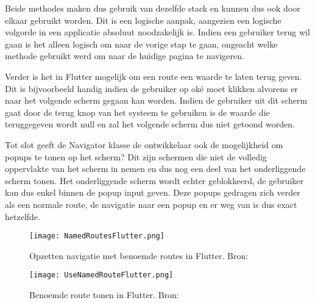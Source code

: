 Beide methodes maken dus gebruik van dezelfde stack en kunnen dus ook door elkaar gebruikt worden. Dit is een logische aanpak, aangezien een logische volgorde in een applicatie absoluut noodzakelijk is. Indien een gebruiker terug wil gaan is het alleen logisch om naar de vorige stap te gaan, ongeacht welke methode gebruikt werd om naar de huidige pagina te navigeren. 

Verder is het in Flutter mogelijk om een route een waarde te laten terug geven. Dit is bijvoorbeeld handig indien de gebruiker op oké moet klikken alvorens er naar het volgende scherm gegaan kan worden. Indien de gebruiker uit dit scherm gaat door de terug knop van het systeem te gebruiken is de waarde die teruggegeven wordt null en zal het volgende scherm dus niet getoond worden.

Tot slot geeft de Navigator klasse de ontwikkelaar ook de mogelijkheid om popups te tonen op het scherm? Dit zijn schermen die niet de volledig oppervlakte van het scherm in nemen en dus nog een deel van het onderliggende scherm tonen. Het onderliggende scherm wordt echter geblokkeerd, de gebruiker kan dus enkel binnen de popup input geven. Deze popups gedragen zich verder als een normale route, de navigatie naar een popup en er weg van is dus exact hetzelfde.

\begin{figure}
    \texttt{[image: NamedRoutesFlutter.png]}
    \caption{Opzetten navigatie met benoemde routes in Flutter. Bron: \textcite{Flutter.dev2020}}
    \label{fig:namedRoutesFlutter}
\end{figure}

\begin{figure}
    \texttt{[image: UseNamedRouteFlutter.png]}
    \caption{Benoemde route tonen in Flutter. Bron: \textcite{Flutter.dev2020}}
    \label{fig:useNamedRoutesFlutter}
\end{figure}



